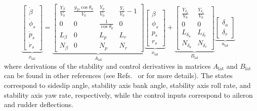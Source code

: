 \begin{equation}
	\underbrace{\begin{bmatrix}\dot \beta \\ \dot \phi_s \\ \dot p_s \\ \dot r_s \end{bmatrix}}_{\dot{x}_{\mathrm{lat}}} = \underbrace{\begin{bmatrix}
			\frac{Y_\beta}{V_0} & \frac{g_D\cos{\theta_0}}{V_0} & \frac{Y_p}{V_0} & \frac{Y_r}{V_0} - 1 \\
			0 & 0 & \frac{1}{\cos{\theta_0}} & 0 \\
			L_\beta & 0 & L_p & L_r \\
			N_\beta & 0 & N_p & N_r
		\end{bmatrix}}_{A_{\mathrm{lat}}}
		\underbrace{\begin{bmatrix} \beta \\ \phi_s \\ p_s \\ r_s \end{bmatrix}}_{\dot{x}_{\mathrm{lat}}} + 
		\underbrace{\begin{bmatrix}
			\frac{Y_{\delta_a}}{V_0} & \frac{Y_{\delta_r}}{V_0} \\
			0 & 0 \\
			L_{\delta_a} & L_{\delta_r} \\
			N_{\delta_a} & N_{\delta_r} 
		\end{bmatrix}}_{B_{\mathrm{lat}}} 
		\underbrace{\begin{bmatrix}\delta_a \\ \delta_r \end{bmatrix}}_{u_{\mathrm{lat}}}
\end{equation}
\noindent where derivations of the stability and control derivatives in matrices $A_{\mathrm{lat}}$ and $B_{\mathrm{lat}}$ can be found in other references (see Refs.~\cite{stevens2015aircraft} or \cite{lavretsky2013robust} for more details). The states correspond to sideslip angle, stability axis bank angle, stability axis roll rate, and stability axis yaw rate, respectively, while the control inputs correspond to aileron and rudder deflections.

